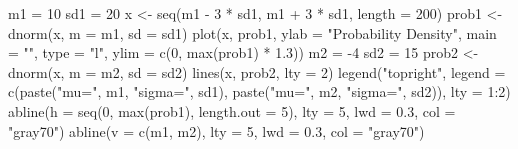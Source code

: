 \begin{Schunk}
\begin{Sinput}
 m1 = 10
 sd1 = 20
 x <- seq(m1 - 3 * sd1, m1 + 3 * sd1, length = 200)
 prob1 <- dnorm(x, m = m1, sd = sd1)
 plot(x, prob1, ylab = "Probability Density", main = "", 
        type = "l", ylim = c(0, max(prob1) * 1.3))
 m2 = -4
 sd2 = 15
 prob2 <- dnorm(x, m = m2, sd = sd2)
 lines(x, prob2, lty = 2)
 legend("topright", legend = c(paste("mu=", m1, 
        "sigma=", sd1), paste("mu=", m2, "sigma=", 
        sd2)), lty = 1:2)
 abline(h = seq(0, max(prob1), length.out = 5), 
        lty = 5, lwd = 0.3, col = "gray70")
 abline(v = c(m1, m2), lty = 5, lwd = 0.3, col = "gray70")
\end{Sinput}
\end{Schunk}
